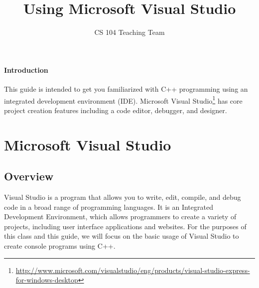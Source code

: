 \documentclass[twocolumn]{article}
\title{Using Microsoft Visual Studio}
\author{CS 104 Teaching Team}
\date{}
\begin{document}
\graphicspath{ {./images/} }
\maketitle
\paragraph{Introduction} This guide is intended to get you familiarized with C++ programming using an integrated development environment (IDE). Microsoft Visual Studio\footnote{\url{http://www.microsoft.com/visualstudio/eng/products/visual-studio-express-for-windows-desktop}} has core project creation features including a code editor, debugger, and designer.

\section{Microsoft Visual Studio}
\subsection{Overview} Visual Studio is a program that allows you to write, edit, compile, and debug code in a broad range of programming languages. It is an Integrated Development Environment, which allows programmers to create a variety of projects, including user interface applications and websites. For the purposes of this class and this guide, we will focus on the basic usage of Visual Studio to create console programs using C++. 
\end{document}
